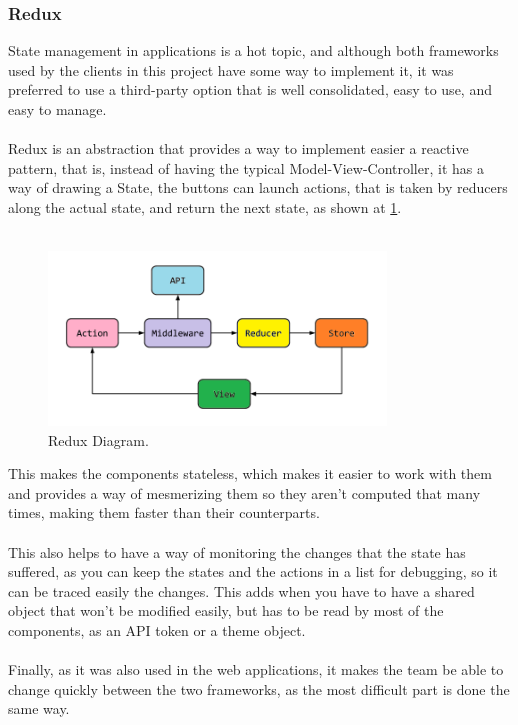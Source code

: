 \documentclass[./main.tex]{subfiles}
\begin{document}
	\subsubsection{Redux}
	State management in applications is a hot topic, and although both frameworks used by the clients in this project have some way to implement it, it was preferred to use a third-party option that is well consolidated, easy to use, and easy to manage.\\
	\\
	Redux is an abstraction that provides a way to implement easier a reactive pattern, that is, instead of having the typical Model-View-Controller, it has a way of drawing a State, the buttons can launch actions, that is taken by reducers along the actual state, and return the
	next state, as shown at \ref{fig:redux}.\\
	\\
	\begin{figure}[H]
		\centering
		\includegraphics[width=0.8\textwidth]{img/redux.png}
		\caption{Redux Diagram.}
		\label{fig:redux}
	\end{figure}
	This makes the components stateless, which makes it easier to work with them and provides a way of mesmerizing them so they aren't computed that many times, making them faster than their counterparts. 
	\\
	\\
	This also helps to have a way of monitoring the changes that the state has suffered, as you can keep the states and the actions in a list for debugging, so it can be traced easily the changes. This adds when you have to have a shared object that won't be modified easily, but has to be read by most of the components, as an API token or a theme object.
	\\
	\\
	Finally, as it was also used in the web applications, it makes the team be able to change quickly between the two frameworks, as the most difficult part is done the same way.
	\\

	
\end{document}
